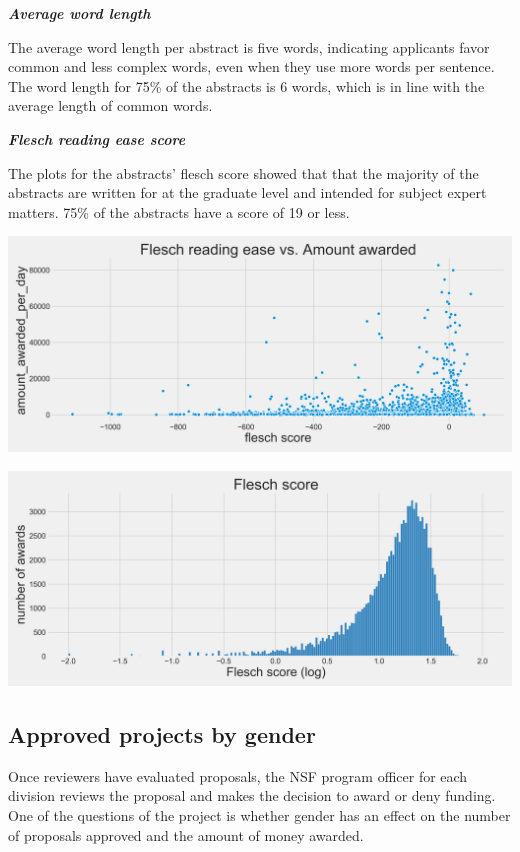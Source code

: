 \documentclass[11pt, oneside]{article}   	%
\begin{document}
\textbf{\emph{Average word length}}

The average word length per abstract is five words, indicating applicants favor common and less complex words, even when they use more words per sentence. The word length for 75\% of the abstracts is 6 words, which is in line with the average length of common words.

\textbf{\emph{Flesch reading ease score}}

The plots for the abstracts' flesch score showed that that the majority of the abstracts are written for at the graduate level and intended for subject expert matters. 75\% of the abstracts have a score of 19 or less.

\includegraphics[width=\textwidth]{fleschscore}

 \includegraphics[width=\textwidth]{fleschscorehist}
 
 \subsection{Approved projects by gender} 
 
Once reviewers have evaluated proposals, the NSF program officer for each division reviews the proposal and makes the decision to award or deny funding. One of the questions of the project is whether gender has an effect on the number of proposals approved and the amount of money awarded.
 
\end{document}
